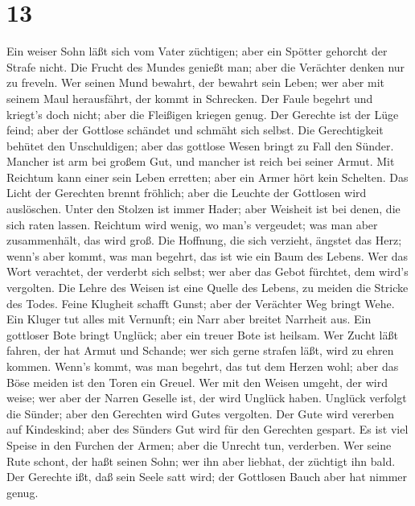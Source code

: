 \hypertarget{section-12}{%
\section{13}\label{section-12}}

 Ein weiser Sohn läßt sich vom Vater züchtigen; aber ein
Spötter gehorcht der Strafe nicht.  Die Frucht des Mundes
genießt man; aber die Verächter denken nur zu freveln.  Wer
seinen Mund bewahrt, der bewahrt sein Leben; wer aber mit seinem Maul
herausfährt, der kommt in Schrecken.  Der Faule begehrt und
kriegt's doch nicht; aber die Fleißigen kriegen genug.  Der
Gerechte ist der Lüge feind; aber der Gottlose schändet und schmäht sich
selbst.  Die Gerechtigkeit behütet den Unschuldigen; aber
das gottlose Wesen bringt zu Fall den Sünder.  Mancher ist
arm bei großem Gut, und mancher ist reich bei seiner Armut. 
Mit Reichtum kann einer sein Leben erretten; aber ein Armer hört kein
Schelten.  Das Licht der Gerechten brennt fröhlich; aber die
Leuchte der Gottlosen wird auslöschen.  Unter den Stolzen
ist immer Hader; aber Weisheit ist bei denen, die sich raten lassen.
 Reichtum wird wenig, wo man's vergeudet; was man aber
zusammenhält, das wird groß.  Die Hoffnung, die sich
verzieht, ängstet das Herz; wenn's aber kommt, was man begehrt, das ist
wie ein Baum des Lebens.  Wer das Wort verachtet, der
verderbt sich selbst; wer aber das Gebot fürchtet, dem wird's vergolten.
 Die Lehre des Weisen ist eine Quelle des Lebens, zu meiden
die Stricke des Todes.  Feine Klugheit schafft Gunst; aber
der Verächter Weg bringt Wehe.  Ein Kluger tut alles mit
Vernunft; ein Narr aber breitet Narrheit aus.  Ein
gottloser Bote bringt Unglück; aber ein treuer Bote ist heilsam.
 Wer Zucht läßt fahren, der hat Armut und Schande; wer sich
gerne strafen läßt, wird zu ehren kommen.  Wenn's kommt,
was man begehrt, das tut dem Herzen wohl; aber das Böse meiden ist den
Toren ein Greuel.  Wer mit den Weisen umgeht, der wird
weise; wer aber der Narren Geselle ist, der wird Unglück haben.
 Unglück verfolgt die Sünder; aber den Gerechten wird Gutes
vergolten.  Der Gute wird vererben auf Kindeskind; aber des
Sünders Gut wird für den Gerechten gespart.  Es ist viel
Speise in den Furchen der Armen; aber die Unrecht tun, verderben.
 Wer seine Rute schont, der haßt seinen Sohn; wer ihn aber
liebhat, der züchtigt ihn bald.  Der Gerechte ißt, daß sein
Seele satt wird; der Gottlosen Bauch aber hat nimmer genug.

